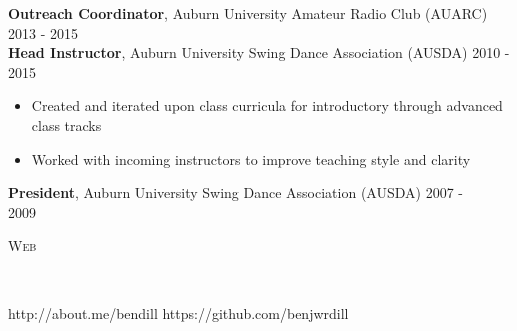 \documentclass[9pt]{article}
\newenvironment{changemargin}[2]{%
  \begin{list}{}{%
    \setlength{\topsep}{0pt}%
    \setlength{\leftmargin}{#1}%
    \setlength{\rightmargin}{#2}%
    \setlength{\listparindent}{\parindent}%
    \setlength{\itemindent}{\parindent}%
    \setlength{\parsep}{\parskip}%
  }%
  \item[]}{\end{list}
}
\newcommand{\lineover}{
	\begin{changemargin}{-0.05in}{-0.05in}
		\vspace*{-8pt}
		\hrulefill \\
		\vspace*{-2pt}
	\end{changemargin}
}
\newcommand{\header}[1]{
	\begin{changemargin}{-0.5in}{-0.5in}
		\scshape{#1}\\
  	\lineover
	\end{changemargin}
}
\newenvironment{body} {
	\vspace*{-16pt}
	\begin{changemargin}{-0.25in}{-0.5in}
  }	
	{\end{changemargin}
}
\begin{document}
\begin{body}
\begin{itemize}
	\end{itemize}	
	\textbf{Outreach Coordinator}, Auburn University Amateur Radio Club (AUARC) \hfill {} 2013 - 2015\\
	\textbf{Head Instructor}, Auburn University Swing Dance Association (AUSDA) \hfill {} 2010 - 2015\\
	\vspace{-4pt}
	\begin{itemize} \itemsep -0pt
		\item{Created and iterated upon class curricula for introductory through advanced class tracks}
		\item{Worked with incoming instructors to improve teaching style and clarity}
	\end{itemize}
	\textbf{President}, Auburn University Swing Dance Association (AUSDA) \hfill {} 2007 - 2009\ \ \ \ \ \ \\
\end{body}

\smallskip


\header{Web}

\begin{body}
	\vspace{17pt}
	http://about.me/bendill \hfill{} https://github.com/benjwrdill \\
\end{body}
\end{document}
